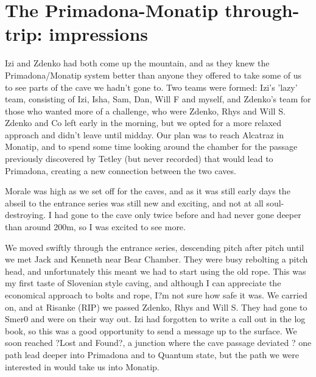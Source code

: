 \section{The Primadona-Monatip through-trip: impressions}

\begin{marginfigure}
\end{marginfigure}


Izi and Zdenko had both come up the mountain, and as they knew the Primadona/Monatip system better than anyone they offered to take some of us to see parts of the cave we hadn't gone to. Two teams were formed: Izi's 'lazy' team, consisting of Izi, Isha, Sam, Dan, Will F and myself, and Zdenko's team for those who wanted more of a challenge, who were Zdenko, Rhys and Will S. Zdenko and Co left early in the morning, but we opted for a more relaxed approach and didn't leave until midday. Our plan was to reach Alcatraz in Monatip, and to spend some time looking around the chamber for the passage previously discovered by Tetley (but never recorded) that would lead to Primadona, creating a new connection between the two caves.

Morale was high as we set off for the caves, and as it was still early days the abseil to the entrance series was still new and exciting, and not at all soul-destroying. I had gone to the cave only twice before and had never gone deeper than around 200m, so I was excited to see more.


We moved swiftly through the entrance series, descending pitch after pitch until we met Jack and Kenneth near Bear Chamber. They were busy rebolting a pitch head, and unfortunately this meant we had to start using the old rope. This was my first taste of Slovenian style caving, and although I can appreciate the economical approach to bolts and rope, I?m not sure how safe it was. We carried on, and at Risanke (RIP) we passed Zdenko, Rhys and Will S. They had gone to Smer0 and were on their way out. Izi had forgotten to write a call out in the log book, so this was a good opportunity to send a message up to the surface. We soon reached ?Lost and Found?, a junction where the cave passage deviated ? one path lead deeper into Primadona and to Quantum state, but the path we were interested in would take us into Monatip. 

